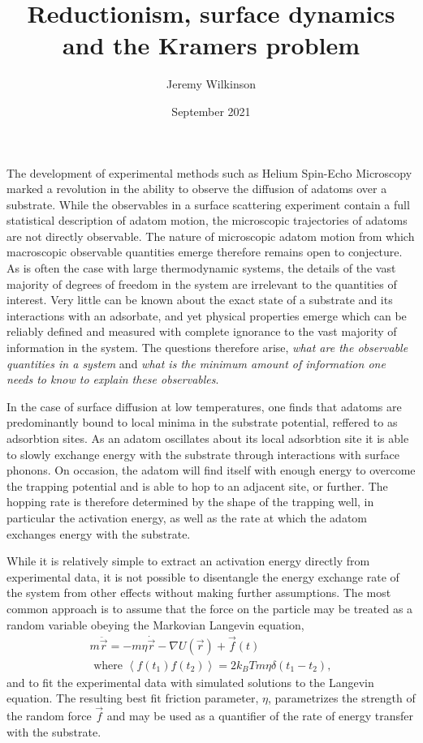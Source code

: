 \documentclass[7pt]{article}
\title{Reductionism, surface dynamics and the Kramers problem}
\author{Jeremy Wilkinson}
\date{September 2021}
\begin{document}
\maketitle

The development of experimental methods such as Helium Spin-Echo Microscopy marked a revolution in the ability to observe the diffusion of adatoms over a substrate\cite{FouquetHSEM, JardineHSEM}. While the observables in a surface scattering experiment contain a full statistical description of adatom motion\cite{vanHowe}, the microscopic trajectories of adatoms are not directly observable. The nature of microscopic adatom motion from which macroscopic observable quantities emerge therefore remains open to conjecture. As is often the case with large thermodynamic systems, the details of the vast majority of degrees of freedom in the system are irrelevant to the quantities of interest. Very little can be known about the exact state of a substrate and its interactions with an adsorbate, and yet physical properties emerge which can be reliably defined and measured with complete ignorance to the vast majority of information in the system. The questions therefore arise, \emph{what are the observable quantities in a system} and \emph{what is the minimum amount of information one needs to know to explain these observables}. 

In the case of surface diffusion at low temperatures, one finds that adatoms are predominantly bound to local minima in the substrate potential, reffered to as adsorbtion sites. As an adatom oscillates about its local adsorbtion site it is able to slowly exchange energy with the substrate through interactions with surface phonons. On occasion, the adatom will find itself with enough energy to overcome the trapping potential and is able to hop to an adjacent site, or further. The hopping rate is therefore determined by the shape of the trapping well, in particular the activation energy, as well as the rate at which the adatom exchanges energy with the substrate.

While it is relatively simple to extract an activation energy directly from experimental data\cite{someone}, it is not possible to disentangle the energy exchange rate of the system from other effects without making further assumptions. The most common approach is to assume that the force on the particle may be treated as a random variable obeying the Markovian Langevin equation,
\begin{equation}
\begin{gathered}
	m\ddot{\vec{r}}=-m\eta\dot{\vec{r}}-\nabla U(\vec{r})+\vec{f}(t) \\ 
	\text{ where } \left<f(t_1)f(t_2)\right>=2k_BTm\eta\delta(t_1-t_2),
\end{gathered}
	\label{eq:langevin}
\end{equation}
and to fit the experimental data with simulated solutions to the Langevin equation. The resulting best fit friction parameter, $\eta$, parametrizes the strength of the random force $\vec{f}$ and may be used as a quantifier of the rate of energy transfer with the substrate.
\end{document}
